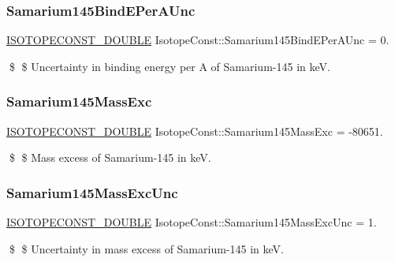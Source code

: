 \subsubsection{\texorpdfstring{Samarium145\+Bind\+E\+Per\+A\+Unc}{Samarium145BindEPerAUnc}}
{\footnotesize\ttfamily \mbox{\hyperlink{group___isotope_const-_macros_ga8f45a7272ce02c0b4c65c44636ed719a}{I\+S\+O\+T\+O\+P\+E\+C\+O\+N\+S\+T\+\_\+\+D\+O\+U\+B\+LE}} Isotope\+Const\+::\+Samarium145\+Bind\+E\+Per\+A\+Unc = 0.}

\$ \$ Uncertainty in binding energy per A of Samarium-\/145 in keV. \mbox{\label{group___isotope_const-_samarium-_sm145_ga92b5221bc7791e91ebe1f0da40e47db5}} 
\subsubsection{\texorpdfstring{Samarium145\+Mass\+Exc}{Samarium145MassExc}}
{\footnotesize\ttfamily \mbox{\hyperlink{group___isotope_const-_macros_ga8f45a7272ce02c0b4c65c44636ed719a}{I\+S\+O\+T\+O\+P\+E\+C\+O\+N\+S\+T\+\_\+\+D\+O\+U\+B\+LE}} Isotope\+Const\+::\+Samarium145\+Mass\+Exc = -\/80651.}

\$ \$ Mass excess of Samarium-\/145 in keV. \mbox{\label{group___isotope_const-_samarium-_sm145_ga2569f043bb3e9d46b7c249e7b212ae51}} 
\subsubsection{\texorpdfstring{Samarium145\+Mass\+Exc\+Unc}{Samarium145MassExcUnc}}
{\footnotesize\ttfamily \mbox{\hyperlink{group___isotope_const-_macros_ga8f45a7272ce02c0b4c65c44636ed719a}{I\+S\+O\+T\+O\+P\+E\+C\+O\+N\+S\+T\+\_\+\+D\+O\+U\+B\+LE}} Isotope\+Const\+::\+Samarium145\+Mass\+Exc\+Unc = 1.}

\$ \$ Uncertainty in mass excess of Samarium-\/145 in keV. \mbox{\label{group___isotope_const-_samarium-_sm145_ga9203c0d6780ee502af8d9bd99e9adb3d}} 
